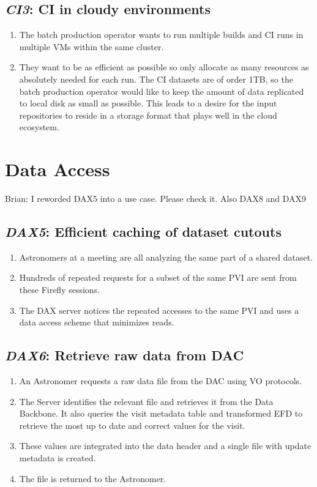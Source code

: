 \documentclass[DM,toc,lsstdraft]{lsstdoc}
\newcommand{\usecase}[3]{%
\subsection{\emph{#1}: #2}
\begin{enumerate}[label=\alph*.]
#3
\end{enumerate}
}
\begin{document}
\usecase{CI3}{CI in cloudy environments}{%

\item
The batch production operator wants to run multiple builds and CI runs in multiple VMs within the same cluster.

\item
They want to be as efficient as possible so only allocate as many resources as absolutely needed for each run.
The CI datasets are of order 1TB, so the batch production operator would like to keep the amount of data replicated to local disk as small as possible.
This leads to a desire for the input repositories to reside in a storage format that plays well in the cloud ecosystem.

}

\section{Data Access}

\begin{draftnote}
  Brian: I reworded DAX5 into a use case. Please check it. Also DAX8 and DAX9
\end{draftnote}

\usecase{DAX5}{Efficient caching of dataset cutouts}{%

\item
Astronomers at a meeting are all analyzing the same part of a shared dataset.

\item
Hundreds of repeated requests for a subset of the same PVI are sent from these Firefly sessions.

\item
The DAX server notices the repeated accesses to the same PVI and uses a data access scheme that minimizes reads.

}

\usecase{DAX6}{Retrieve raw data from DAC}{%

\item
An Astronomer requests a raw data file from the DAC using VO protocols.

\item
The Server identifies the relevant file and retrieves it from the Data Backbone.
It also queries the visit metadata table and transformed EFD to retrieve the most up to date and correct values for the visit.

\item
These values are integrated into the data header and a single file with update metadata is created.

\item
The file is returned to the Astronomer.

}
\end{document}
